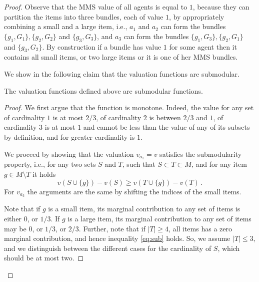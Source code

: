 \begin{proof}
    
    
    Observe that the MMS value of all agents is equal to $1$, because they can partition the items into three bundles, each of value $1$, by appropriately combining a small and a large item, i.e., $a_1$ and $a_2$ can form the bundles $\{g_1,G_1\},\{g_2,G_2\}$ and $\{g_3,G_3\}$, and $a_3$ can form the bundles $\{g_1,G_3\},\{g_2,G_1\}$ and $\{g_3,G_2\}$. By construction if a bundle has value $1$ for some agent then it  contains all small items, or two large items or it is one of her MMS bundles. %
    
    
    We show in the following claim that the valuation functions are submodular. 
    
    \begin{claim}
        The valuation functions defined above are submodular functions.
    \end{claim}
    \begin{proof}
    
    We first argue that the function is monotone. Indeed, the value for any set of cardinality $1$ is at most $2/3$, of cardinality $2$ is between $2/3$ and $1$, of cardinality $3$ is at most $1$ and cannot be less than the value of any of its subsets by definition, and for greater cardinality is $1$. 
    
    We proceed by showing that the valuation $v_{a_1}=v$ satisfies the submodularity property, i.e., for any two sets $S$ and $T$, such that $S \subset T \subset M$, and for any item $g\in M\setminus T$ it holds \begin{equation}
    v\left(S \cup \{g\}\right) - v(S) \ge v(T \cup \{g\}) - v(T)\,. 
    \label{eq:sub}
    \end{equation} 
    For $v_{a_3}$ the arguments are the same by shifting the indices of the small items. 

    

Note that if $g$ is a small item, its marginal contribution to any set of items is either $0$, or $1/3$. If $g$ is a large item, its marginal contribution to any set of items may be $0$, or $1/3$, or $2/3$. Further, note that if $|T|\geq 4$, all items has a zero marginal contribution, and hence inequality \eqref{eq:sub} holds. So, we assume $|T|\leq 3$, and we distinguish between the different cases for the cardinality of $S$, which should be at most two. 


\end{proof}
\end{proof}
